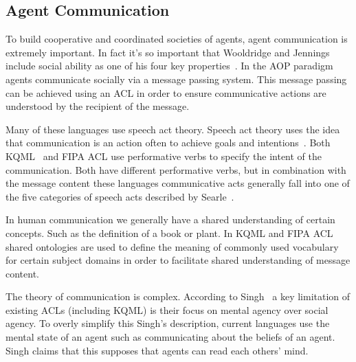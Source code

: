 \documentclass[]{final_report}
\begin{document}
\subsection{Agent Communication}
To build cooperative and coordinated societies of agents, agent communication is extremely important. In fact it's so important that Wooldridge and Jennings include social ability as one of his four key properties~\cite{wooldridge_jennings_1995}. In the AOP paradigm agents communicate socially via a message passing system. This message passing can be achieved using an ACL in order to ensure communicative actions are understood by the recipient of the message.\par 
Many of these languages use speech act theory. Speech act theory uses the idea that communication is an action often to achieve goals and intentions~\cite{austin1975things}. Both KQML~\cite{finin1994kqml} and FIPA ACL use performative verbs to specify the intent of the communication. Both have different performative verbs, but in combination with the message content these languages communicative acts generally fall into one of the five categories of speech acts described by Searle~\cite{searle1969speech}.\par 
In human communication we generally have a shared understanding of certain concepts. Such as the definition of a book or plant. In KQML and FIPA ACL shared ontologies are used to define the meaning of commonly used vocabulary for certain subject domains in order to facilitate shared understanding of message content.\par 
The theory of communication is complex. According to Singh~\cite{singh1998agent} a key limitation of existing ACLs (including KQML) is their focus on mental agency over social agency. To overly simplify this Singh's description, current languages use the mental state of an agent such as communicating about the beliefs of an agent. Singh claims that this supposes that agents can read each others' mind.
\end{document}
